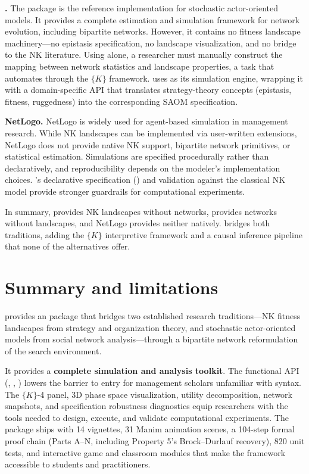\documentclass[
  article]{jss}
\newcounter{none}
\begin{document}
\textbf{.} The  package \citep{RSiena} is the
reference implementation for stochastic actor-oriented models. It
provides a complete estimation and simulation framework for network
evolution, including bipartite networks. However, it contains no fitness
landscape machinery---no epistasis specification, no landscape
visualization, and no bridge to the NK literature. Using 
alone, a researcher must manually construct the mapping between network
statistics and landscape properties, a task that 
automates through the \(\{K\}\) framework.  uses
 as its simulation engine, wrapping it with a
domain-specific API that translates strategy-theory concepts (epistasis,
fitness, ruggedness) into the corresponding SAOM specification.

\textbf{NetLogo.} NetLogo \citep{Wilensky1999} is widely used for
agent-based simulation in management research. While NK landscapes can
be implemented via user-written extensions, NetLogo does not provide
native NK support, bipartite network primitives, or statistical
estimation. Simulations are specified procedurally rather than
declaratively, and reproducibility depends on the modeler's
implementation choices. 's declarative specification
() and validation against the classical NK model
provide stronger guardrails for computational experiments.

In summary,  provides NK landscapes without networks,
 provides networks without landscapes, and NetLogo provides
neither natively.  bridges both traditions, adding the
\(\{K\}\) interpretive framework and a causal inference pipeline that
none of the alternatives offer.

\section{Summary and limitations}\label{sec:conclusion}

 provides an  package that bridges two
established research traditions---NK fitness landscapes from strategy
and organization theory, and stochastic actor-oriented models from
social network analysis---through a bipartite network reformulation of
the search environment.

It provides a \textbf{complete simulation and analysis toolkit}. The
functional API (, ,
) lowers the barrier to entry for management scholars
unfamiliar with  syntax. The \(\{K\}\)-4 panel, 3D phase
space visualization, utility decomposition, network snapshots, and
specification robustness diagnostics equip researchers with the tools
needed to design, execute, and validate computational experiments. The
package ships with 14 vignettes, 31 Manim animation scenes, a 104-step
formal proof chain (Parts A--N, including Property 5's Brock--Durlauf
recovery), 820 unit tests, and interactive game and classroom modules
that make the framework accessible to students and practitioners.
\end{document}
